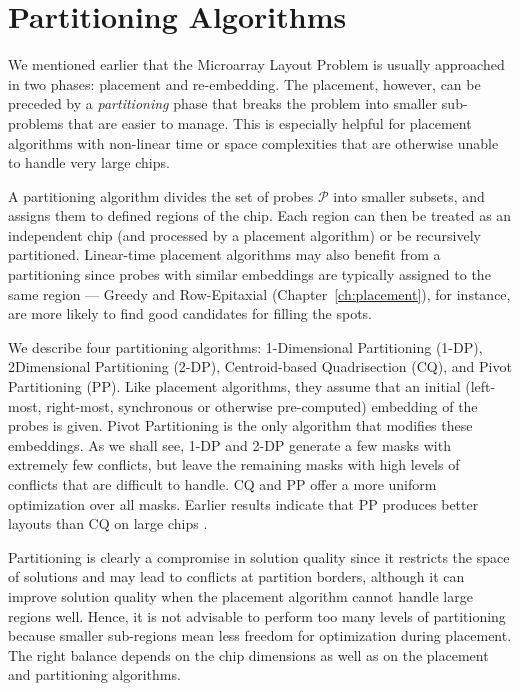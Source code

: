 \chapter{Partitioning Algorithms}
\label{ch:part}

We mentioned earlier that the Microarray Layout Problem is usually approached in
two phases: placement and re-embedding. The placement, however, can be preceded
by a \emph{partitioning} phase that breaks the problem into smaller sub-problems
that are easier to manage. This is especially helpful for placement algorithms
with non-linear time or space complexities that are otherwise unable to handle
very large chips.

A partitioning algorithm divides the set of probes $\mathcal{P}$ into smaller
subsets, and assigns them to defined regions of the chip. Each region can then
be treated as an independent chip (and processed by a placement algorithm) or be
recursively partitioned. Linear-time placement algorithms may also benefit from
a partitioning since probes with similar embeddings are typically assigned to
the same region --- Greedy and Row-Epitaxial (Chapter~\ref{ch:placement}), for
instance, are more likely to find good candidates for filling the spots.

We describe four partitioning algorithms: 1-Dimensional Partitioning (1-DP),
2\hyph Dimensional Partitioning (2-DP), Centroid-based Quadrisection (CQ), and
Pivot Partitioning (PP). Like placement algorithms, they assume that an initial
(left-most, right-most, synchronous or otherwise pre-computed) embedding of the
probes is given. Pivot Partitioning is the only algorithm that modifies these
embeddings.  As we shall see, 1-DP and 2-DP generate a few masks with extremely
few conflicts, but leave the remaining masks with high levels of conflicts that
are difficult to handle. CQ and PP offer a more uniform optimization over all
masks. Earlier results indicate that PP produces better layouts than CQ on large
chips \citep{Carvalho2006}.

Partitioning is clearly a compromise in solution quality since it restricts the
space of solutions and may lead to conflicts at partition borders, although it
can improve solution quality when the placement algorithm cannot handle large
regions well. Hence, it is not advisable to perform too many levels of
partitioning because smaller sub-regions mean less freedom for optimization
during placement. The right balance depends on the chip dimensions as well as on
the placement and partitioning algorithms.

